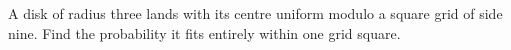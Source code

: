 A disk of radius three lands with its centre uniform modulo a square grid of side nine. Find the probability it fits entirely within one grid square.
